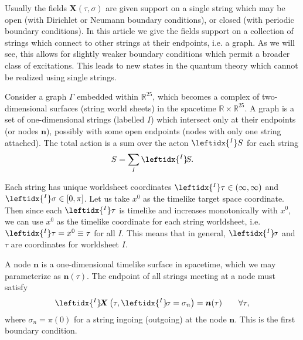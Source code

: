 \documentclass{revtex4}
\newcommand{\be}{\begin{eqnarray}}
\newcommand{\ee}{\end{eqnarray}}
\def\X{\bm{X}}
\def\n{\bm{n}}
\def\lI{\leftidx{^I} \! }
\begin{document}
Usually the fields $\X(\tau, \sigma)$ are given support on a single string which may be open (with Dirichlet or Neumann boundary conditions), or closed (with periodic boundary conditions). In this article we give the fields support on a collection of strings which connect to other strings at their endpoints, i.e. a graph. As we will see, this allows for slightly weaker boundary conditions which permit a broader class of excitations. This leads to new states in the quantum theory which cannot be realized using single strings.

Consider a graph $\Gamma$ embedded within $\mathbb{R}^{25}$, which becomes a complex of two-dimensional surfaces (string world sheets) in the spacetime $\mathbb{R} \times \mathbb{R}^{25}$. A graph is a set of one-dimensional strings (labelled $I$) which intersect only at their endpoints (or nodes $\n$), possibly with some open endpoints (nodes with only one string attached). The total action is a sum over the acton $ \leftidx{^I}S$ for each string
\be
S = \sum_I \lI S.
\ee

Each string has unique worldsheet coordinates $\leftidx{^I}\tau \in (\infty, \infty)$ and $\leftidx{^I}\sigma \in [0, \pi]$. Let us take $x^0$ as the timelike target space coordinate. Then since each $\leftidx{^I}\tau$ is timelike and increases monotonically with $x^0$, we can use $x^0$ as the timelike coordinate for each string worldsheet, i.e. $\leftidx{^I}\tau = x^0 \equiv \tau$ for all $I$. This means that in general, $\lI \sigma$ and $\tau$ are coordinates for worldsheet $I$.

A node $\n$ is a one-dimensional timelike surface in spacetime, which we may parameterize as $\n(\tau)$. The endpoint of all strings meeting at a node must satisfy
\be
\label{BC1}
\lI \X \left( \tau, \lI \sigma = \sigma_n \right) = \n(\tau) \qquad \forall \tau, 
\ee
where $\sigma_n = \pi (0)$ for a string ingoing (outgoing) at the node $\n$. This is the first boundary condition.
\end{document}
